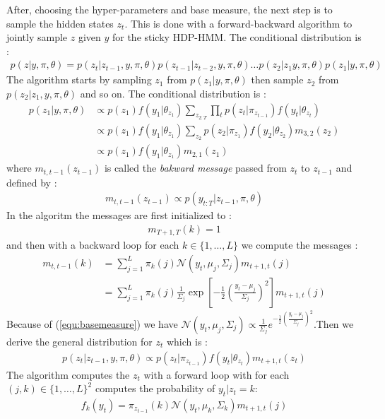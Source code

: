 After, choosing the hyper-parameters and base measure, the next step is to sample the hidden states $z_t$. This is done with a forward-backward algorithm to jointly sample $z$ given $y$ for the sticky HDP-HMM. The conditional distribution is : 
\begin{align*}
	p(z|y, \pi, \theta) = p(z_t|z_{t-1}, y, \pi, \theta) p(z_{t-1}|z_{t-2}, y, \pi, \theta) \dots p(z_2|z_1 y, \pi, \theta) p(z_1| y, \pi, \theta) 
\end{align*} 
The algorithm starts by sampling $z_1$ from $ p(z_1| y, \pi, \theta)$ then sample $z_2$ from $ p(z_2|z_1, y, \pi, \theta)$ and so on. The conditional distribution is :\begin{align*}
	 p(z_1| y, \pi, \theta) &\propto p(z_1)f(y_1|\theta_{z_1})\sum_{z_{2:T}} \prod_t p(z_t|\pi_{z_{t-1}})f(y_t|\theta_{z_t})\\&\propto  p(z_1)f(y_1|\theta_{z_1}) \sum_{z_2}p(z_2|\pi_{z_1})f(y_2|\theta_{z_2})m_{3,2}(z_2)
	 \\ &\propto  p(z_1)f(y_1|\theta_{z_1})m_{2,1}(z_1)
\end{align*}
where $m_{t,t-1}(z_{t-1})$ is called the \textit{bakward message} passed from $z_t$ to $z_{t-1}$ and defined by : 
\begin{align*}
	m_{t,t-1}(z_{t-1}) \propto p(y_{t:T}|z_{t-1},\pi,\theta)
\end{align*}
In the algoritm the messages are first initialized to :\begin{align*}
	m_{T+1,T}(k)=1
\end{align*}
and then with a backward loop for each $k\in \{1,\dots, L\}$ we compute the messages : \begin{align*}
	m_{t,t-1}(k)&=\sum^L_{j=1}\pi_k(j) \mathcal N(y_t, \mu_j, \Sigma_j)m_{t+1, t}(j)\\
	&=\sum^L_{j=1}\pi_k(j) \frac{1}{\Sigma_j}\exp\left[ -\frac{1}{2} \left( \frac{y_t-\mu_j}{\Sigma_j}\right)^2\right]m_{t+1, t}(j)
\end{align*}
Because of (\ref{equ:basemeasure}) we have $\mathcal N(y_t, \mu_j, \Sigma_j)\propto \frac{1}{\Sigma_j} e^{-\frac{1}{2} \left( \frac{y_t-\mu_j}{\Sigma_j}\right)^2}$.Then we derive the general distribution for $z_t$ which is : 
\begin{align*}
	p(z_t|z_{t-1}, y, \pi,\theta) \propto p(z_t|\pi_{z_{t-1}})f(y_t|\theta_{z_t})m_{t+1,t}(z_t)
\end{align*}
The algorithm computes the $z_t$ with a forward loop  with for each $(j,k)\in \{1,\dots, L\}^2$ computes the probability of $y_t|z_t=k$:
\begin{align*}
	f_k(y_t)=\pi_{z_{t-1}}(k)\mathcal N (y_t,\mu_k,\Sigma_k)m_{t+1,t}(j)
\end{align*}
